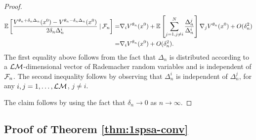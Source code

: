 \begin{proof}
\begin{align}
\mathbb{E}\left[\dfrac{V^{\theta_n + \delta_n \Delta_n}(x^0) - V^{\theta_n - \delta_n \Delta_n}(x^0)}{2 \delta_n \Delta_n^i} \left.\right| \mathcal{F}_n\right] 
=& \nabla_i V^{\theta_n}(x^0) + \mathbb{E}\left[\sum_{j=1,j\not=i}^{N} \frac{\Delta_n^j}{\Delta_n^i}\right]\nabla_j V^{\theta_n}(x^0) + O(\delta_n^2)\nonumber\\
= & \nabla_i V^{\theta_n}(x^0) + O(\delta_n^2).\label{eq:l2}
\end{align}
The first equality above follows from the fact that $\Delta_n$ is distributed according to a $\mathcal{L}\mathcal{M}$-dimensional vector of Rademacher random variables and is independent of $\mathcal{F}_n$. The second inequality follows by observing that $\Delta_n^i$ is independent of $\Delta_n^j$, for any $i,j =1,\ldots,\mathcal{L}\mathcal{M}$, $j\ne i$. 

The claim follows by using the fact that $\delta_n \rightarrow 0$ as $n\rightarrow \infty$.
\end{proof}

\subsection*{Proof of Theorem \ref{thm:1spsa-conv}}

